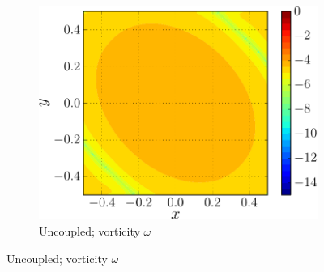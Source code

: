 \begin{figure}[!p]
\begin{subfigure}[t]{0.45\textwidth}
             \includegraphics[width=\linewidth]{./figures/hybrid/lambOseent2/lambOseen_uncoupled_wErrorFinal_compressed-crop.pdf}
             \caption{Uncoupled; vorticity $\omega$}
             \label{fig:lambOseen_uncoupled_wErrorFinal}
     \end{subfigure}%
       

\end{figure}
